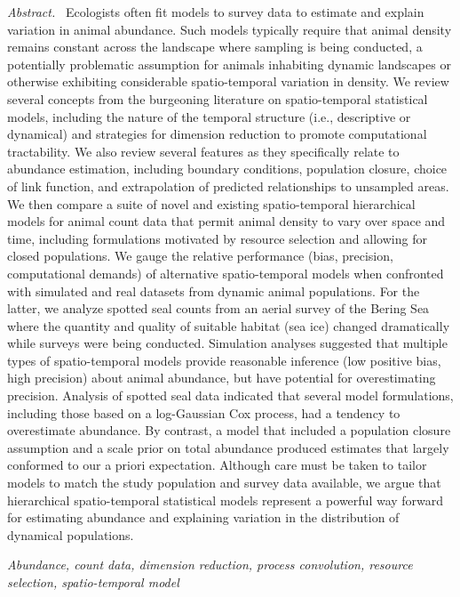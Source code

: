 \documentclass[12pt,english]{article}
\begin{document}
\begin{spacing}{1.9}
{\em Abstract.\ }  Ecologists often fit models to survey data to estimate and explain variation in animal abundance. Such models typically require that animal density remains constant across the landscape where sampling is being conducted, a potentially problematic assumption for animals inhabiting dynamic landscapes or otherwise exhibiting considerable spatio-temporal variation in density.  We review several concepts from the burgeoning literature on spatio-temporal statistical models, including the nature of the temporal structure (i.e., descriptive or dynamical) and strategies for dimension reduction to promote computational tractability.  We also review several features as they specifically relate to abundance estimation, including boundary conditions, population closure, choice of link function, and extrapolation of predicted relationships to unsampled areas.
We then compare a suite of novel and existing spatio-temporal hierarchical models for animal count data that permit animal density to vary over space and time, including formulations motivated by resource selection and allowing for closed populations.  We gauge the relative performance (bias, precision, computational demands) of alternative spatio-temporal models when confronted with simulated and real datasets from dynamic animal populations.  For the latter, we analyze spotted seal counts from an aerial survey of the Bering Sea where the quantity and quality of suitable habitat (sea ice) changed dramatically while surveys were being conducted.  Simulation analyses suggested that multiple types of spatio-temporal models provide reasonable inference (low positive bias, high precision) about animal abundance, but have potential for overestimating precision.  Analysis of spotted seal data indicated that several model formulations, including those based on a log-Gaussian Cox process, had a tendency to overestimate abundance.  By contrast, a model that included a population closure assumption and a scale prior on total abundance produced estimates that largely conformed to our a priori expectation. Although care must be taken to tailor models to match the study population and survey data available, we argue that hierarchical spatio-temporal statistical models represent a powerful way forward for estimating abundance and explaining variation in the distribution of dynamical populations.


{\em Abundance, count data, dimension reduction, process convolution, resource selection, spatio-temporal model}




\end{spacing}
\end{document}
